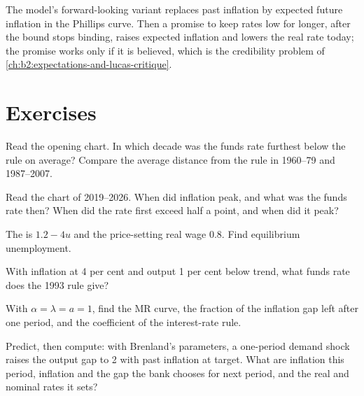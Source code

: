 The model's forward-looking variant replaces past inflation by expected future inflation in the Phillips curve. Then a
promise to keep rates low for longer, after the bound stops binding, raises expected inflation and lowers the real rate
today; the promise works only if it is believed, which is the credibility problem of
\cref{ch:b2:expectations-and-lucas-critique}.

\section{Exercises}\label{sec:b2:three-equation-model:exercises}

\begin{exercise}[$\star$]\label{exo:b2:three-equation-model:1}
Read the opening chart. In which decade was the funds rate furthest below the rule on average? Compare the average distance
from the rule in 1960--79 and 1987--2007.
\end{exercise}

\begin{exercise}[$\star$]\label{exo:b2:three-equation-model:2}
Read the chart of 2019--2026. When did inflation peak, and what was the funds rate then? When did the rate first exceed half a
point, and when did it peak?
\end{exercise}

\begin{exercise}[$\star$]\label{exo:b2:three-equation-model:3}
The  is $1.2 - 4u$ and the price-setting real wage 0.8. Find equilibrium unemployment.
\end{exercise}

\begin{exercise}[$\star$]\label{exo:b2:three-equation-model:4}
With inflation at 4 per cent and output 1 per cent below trend, what funds rate does the 1993 rule give?
\end{exercise}

\begin{exercise}[$\star\star$]\label{exo:b2:three-equation-model:5}
With $\alpha = \lambda = a = 1$, find the MR curve, the fraction of the inflation gap left after one period, and the coefficient of the interest-rate rule.
\end{exercise}

\begin{exercise}[$\star\star$]\label{exo:b2:three-equation-model:6}
Predict, then compute: with Brenland's parameters, a one-period demand shock raises the output gap to 2 with past inflation at target.
What are inflation this period, inflation and the gap the bank chooses for next period, and the real and nominal rates it sets?
\end{exercise}

